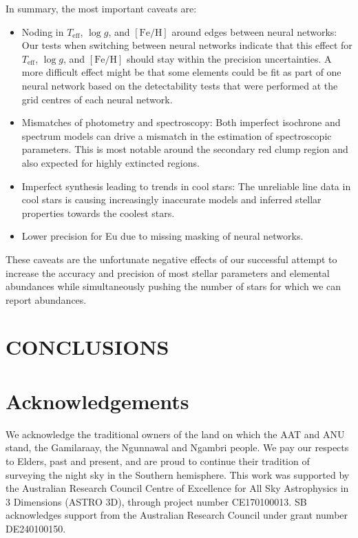 \documentclass[
  journal=pasa,
  manuscript=research-paper, %
  year=2024,
  volume=37
]{cup-journal}
\newcommand{\Teff}{$T_\mathrm{eff}$\xspace}
\newcommand{\logg}{$\log g$\xspace}
\newcommand{\feh}{$\mathrm{[Fe/H]}$\xspace}
\newcommand{\TLF}{\Teff, \logg, and \feh}
\begin{document}
In summary, the most important caveats are:
\begin{itemize}
    \item Noding in \TLF around edges between neural networks: Our tests when switching between neural networks indicate that this effect for \TLF should stay within the precision uncertainties. A more difficult effect might be that some elements could be fit as part of one neural network based on the detectability tests that were performed at the grid centres of each neural network.
    \item Mismatches of photometry and spectroscopy: Both imperfect isochrone and spectrum models can drive a mismatch in the estimation of spectroscopic parameters. This is most notable around the secondary red clump region and also expected for highly extincted regions.
    \item Imperfect synthesis leading to trends in cool stars: The unreliable line data in cool stars is causing increasingly inaccurate models and inferred stellar properties towards the coolest stars.
    \item Lower precision for Eu due to missing masking of neural networks.
\end{itemize}

These caveats are the unfortunate negative effects of our successful attempt to increase the accuracy and precision of most stellar parameters and elemental abundances while simultaneously pushing the number of stars for which we can report abundances.

\section{CONCLUSIONS}
\label{sec:conclusion}




\section*{Acknowledgements}

We acknowledge the traditional owners of the land on which the AAT and ANU stand, the Gamilaraay, the Ngunnawal and Ngambri people. We pay our respects to Elders, past and present, and are proud to continue their tradition of surveying the night sky in the Southern hemisphere.
This work was supported by the Australian Research Council Centre of Excellence for All Sky Astrophysics in 3 Dimensions (ASTRO 3D), through project number CE170100013. SB acknowledges support from the Australian Research Council under grant number DE240100150.
\end{document}
